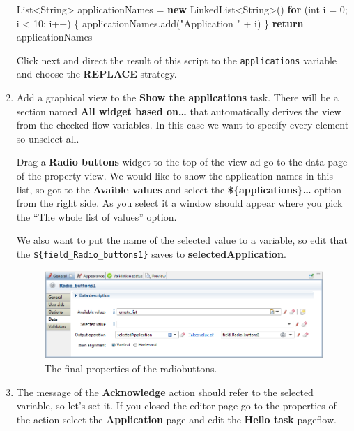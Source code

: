 \documentclass[]{report}
\newenvironment{Shaded}{}{}
\newcommand{\KeywordTok}[1]{\textcolor[rgb]{0.00,0.44,0.13}{\textbf{{#1}}}}
\newcommand{\DataTypeTok}[1]{\textcolor[rgb]{0.56,0.13,0.00}{{#1}}}
\newcommand{\DecValTok}[1]{\textcolor[rgb]{0.25,0.63,0.44}{{#1}}}
\newcommand{\StringTok}[1]{\textcolor[rgb]{0.25,0.44,0.63}{{#1}}}
\newcommand{\FunctionTok}[1]{\textcolor[rgb]{0.02,0.16,0.49}{{#1}}}
\newcommand{\NormalTok}[1]{{#1}}
\let\Oldincludegraphics\includegraphics
\renewcommand{\includegraphics}[1]{
\begin{adjustbox}{max size={\textwidth}{\textheight}}
    \Oldincludegraphics[scale=0.6]{#1}%
\end{adjustbox}
}
\begin{document}
\begin{enumerate}
\begin{Shaded}
\begin{Highlighting}[]
\NormalTok{List<String> applicationNames = }\KeywordTok{new} \NormalTok{LinkedList<String>()}
\KeywordTok{for} \NormalTok{(}\DataTypeTok{int} \NormalTok{i = }\DecValTok{0}\NormalTok{; i < }\DecValTok{10}\NormalTok{; i++) \{}
  \NormalTok{applicationNames.}\FunctionTok{add}\NormalTok{(}\StringTok{"Application "} \NormalTok{+ i)}
\NormalTok{\}}
\KeywordTok{return} \NormalTok{applicationNames}
\end{Highlighting}
\end{Shaded}

  Click next and direct the result of this script to the
  \texttt{applications} variable and choose the \textbf{REPLACE}
  strategy.
\item
  Add a graphical view to the \textbf{Show the applications} task. There
  will be a section named \textbf{All widget based on\ldots{}} that
  automatically derives the view from the checked flow variables. In
  this case we want to specify every element so unselect all.

  Drag a \textbf{Radio buttons} widget to the top of the view ad go to
  the data page of the property view. We would like to show the
  application names in this list, so got to the \textbf{Avaible values}
  and select the \textbf{\$\{applications\}\ldots{}} option from the
  right side. As you select it a window should appear where you pick the
  ``The whole list of values'' option.

  We also want to put the name of the selected value to a variable, so
  edit that the \texttt{\$\{field\_Radio\_buttons1\}} saves to
  \textbf{selectedApplication}.

  \begin{figure}[htbp]
  \centering
  \includegraphics{img/bpmn/bonita_radio_buttons.png}
  \caption{The final properties of the radiobuttons.}
  \end{figure}
\item
  The message of the \textbf{Acknowledge} action should refer to the
  selected variable, so let's set it. If you closed the editor page go
  to the properties of the action select the \textbf{Application} page
  and edit the \textbf{Hello task} pageflow.


\end{enumerate}
\end{document}
